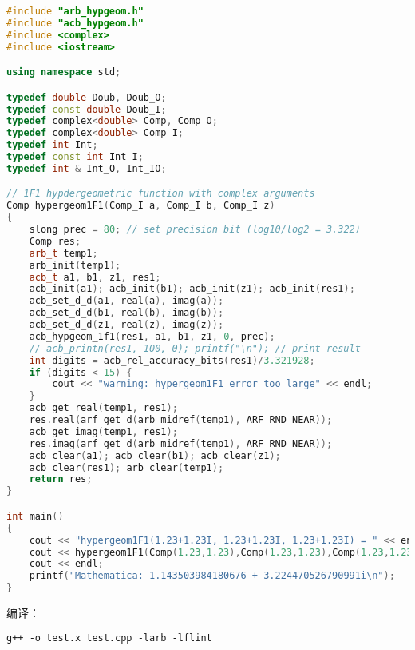 \begin{lstlisting}[language=cpp, caption=test.cpp]
#include "arb_hypgeom.h"
#include "acb_hypgeom.h"
#include <complex>
#include <iostream>

using namespace std;

typedef double Doub, Doub_O;
typedef const double Doub_I;
typedef complex<double> Comp, Comp_O;
typedef complex<double> Comp_I;
typedef int Int;
typedef const int Int_I;
typedef int & Int_O, Int_IO;

// 1F1 hypdergeometric function with complex arguments
Comp hypergeom1F1(Comp_I a, Comp_I b, Comp_I z)
{
	slong prec = 80; // set precision bit (log10/log2 = 3.322)
	Comp res;
	arb_t temp1;
	arb_init(temp1);
	acb_t a1, b1, z1, res1;
	acb_init(a1); acb_init(b1); acb_init(z1); acb_init(res1);
	acb_set_d_d(a1, real(a), imag(a));
	acb_set_d_d(b1, real(b), imag(b));
	acb_set_d_d(z1, real(z), imag(z));
	acb_hypgeom_1f1(res1, a1, b1, z1, 0, prec);
	// acb_printn(res1, 100, 0); printf("\n"); // print result
	int digits = acb_rel_accuracy_bits(res1)/3.321928;
	if (digits < 15) {
		cout << "warning: hypergeom1F1 error too large" << endl;
	}
	acb_get_real(temp1, res1);
	res.real(arf_get_d(arb_midref(temp1), ARF_RND_NEAR));
	acb_get_imag(temp1, res1);
	res.imag(arf_get_d(arb_midref(temp1), ARF_RND_NEAR));
	acb_clear(a1); acb_clear(b1); acb_clear(z1);
    acb_clear(res1); arb_clear(temp1);
	return res;
}

int main()
{
	cout << "hypergeom1F1(1.23+1.23I, 1.23+1.23I, 1.23+1.23I) = " << endl;
	cout << hypergeom1F1(Comp(1.23,1.23),Comp(1.23,1.23),Comp(1.23,1.23))
    cout << endl;
	printf("Mathematica: 1.143503984180676 + 3.224470526790991i\n");
}
\end{lstlisting}
编译：
\begin{lstlisting}[language=makefile]
g++ -o test.x test.cpp -larb -lflint
\end{lstlisting}
